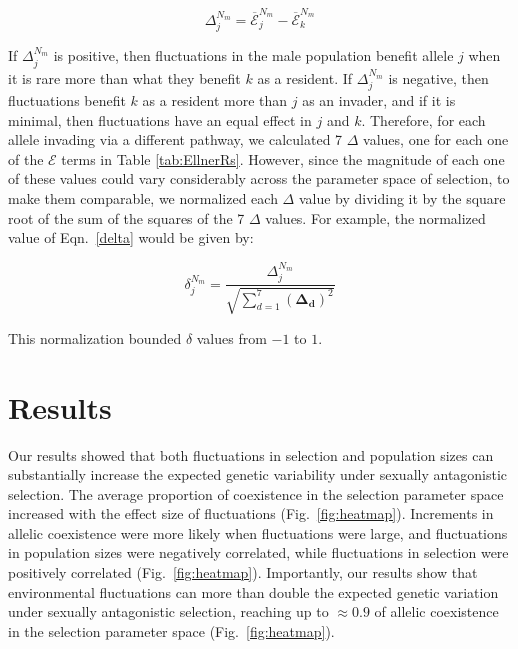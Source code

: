 \begin{equation}
\Delta^{N_{m}}_{j}= \overline{\mathcal{E}}^{N_{m}}_{j} - \overline{\mathcal{E}}^{N_{m}}_{k}
\label{delta}
\end{equation}

If $\Delta^{N_{m}}_{j}$ is positive, then fluctuations in the male population benefit allele $j$ when it is rare more than what they benefit $k$ as a resident. If $\Delta^{N_{m}}_{j}$ is negative, then fluctuations benefit $k$ as a resident more than $j$ as an invader, and if it is minimal, then fluctuations have an equal effect in $j$ and $k$. Therefore, for each allele invading via a different pathway, we calculated 7 $\Delta$ values, one for each one of the $\mathcal{E}$ terms in Table \ref{tab:EllnerRs}. However, since the magnitude of each one of these values could vary considerably across the parameter space of selection, to make them comparable, we normalized each $\Delta$ value by dividing it by the square root of the sum of the squares of the 7 $\Delta$ values. For example, the normalized value of Eqn.~\ref{delta} would be given by:



\begin{equation}
  \delta^{N_{m}}_{j}= \frac{\Delta^{N_{m}}_{j}}{\sqrt{
    \sum\limits_{d=1}^{7} (\boldsymbol{\Delta_{d}})^{2} }}
\end{equation}

This normalization bounded $\delta$ values from $-1$ to $1$.

\section{Results}
Our results showed that both fluctuations in selection and population sizes can substantially increase the expected genetic variability under sexually antagonistic selection. The average proportion of coexistence in the selection parameter space increased with the effect size of fluctuations (Fig.~\ref{fig:heatmap}). Increments in allelic coexistence were more likely when fluctuations were large, and fluctuations in population sizes were negatively correlated, while fluctuations in selection were positively correlated (Fig.~\ref{fig:heatmap}). Importantly, our results show that environmental fluctuations can more than double the expected genetic variation under sexually antagonistic selection, reaching up to  $\approx 0.9$  of allelic coexistence in the selection parameter space (Fig.~\ref{fig:heatmap}).

